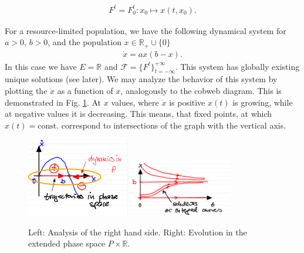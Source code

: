 \begin{align}
	\boxed{ F^{t} = F_{0}^{t}: x_0 \mapsto x(t,x_0).}
\end{align}
\begin{ex}
	For a resource-limited population, we have the following dynamical system for $a> 0$, $b> 0$, and the population $x\in \mathbb{R}_+ \cup \{0\}$
	\begin{align}
		\dot{x} = ax(b-x).
	\end{align}
	In this case we have $E=\mathbb{R}$ and $\mathcal{F} = \{F^{t}\}_{t=-\infty }^{+\infty }$. This system has globally existing unique solutions (see later).	We may analyze the behavior of this system by plotting the $\dot{x}$ as a function of $x$, analogously to the cobweb diagram. This is demonstrated in Fig. \ref{fig:intro:3}. At $x$ values, where $\dot{x}$ is positive $x(t)$ is growing, while at negative values it is decreasing. This means, that fixed points, at which $x(t)=\text{const.}$ correspond to intersections of the graph with the vertical axis. 
	\begin{figure}[H]
		\centering
		\includegraphics[width=0.4\textwidth]{figures/intro/3RHS.png}	
		\hspace{0.05\textwidth}
		\includegraphics[width=0.4\textwidth]{figures/intro/4solutions.png}
		\caption{Left: Analysis of the right hand side. Right: Evolution in the extended phase space $P \times \mathbb{R}$.}
		\label{fig:intro:3}
	\end{figure}

\end{ex}

